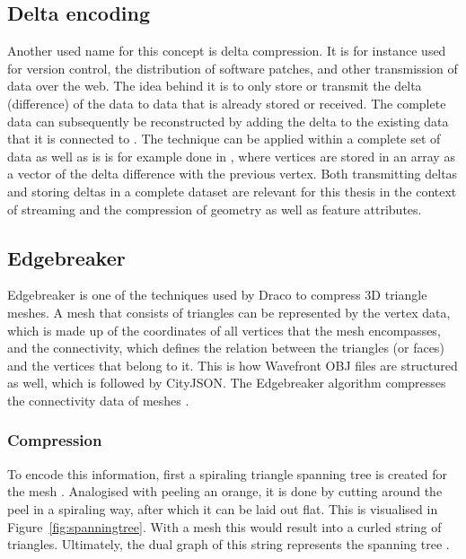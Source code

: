 \subsection{Delta encoding}
Another used name for this concept is delta compression.
It is for instance used for version control, the distribution of software patches, and other transmission of data over the web.
The idea behind it is to only store or transmit the delta (difference) of the data to data that is already stored or received.
The complete data can subsequently be reconstructed by adding the delta to the existing data that it is connected to \citep{suel2019delta}.
The technique can be applied within a complete set of data as well as is is for example done in \citet{deering1995geometry}, where vertices are stored in an array as a vector of the delta difference with the previous vertex.
Both transmitting deltas and storing deltas in a complete dataset are relevant for this thesis in the context of streaming and the compression of geometry as well as feature attributes.




\subsection{Edgebreaker}
\label{sec:theoryedgebreaker}

Edgebreaker is one of the techniques used by Draco to compress 3D triangle meshes.
A mesh that consists of triangles can be represented by the vertex data, which is made up of the coordinates of all vertices that the mesh encompasses, and the connectivity, which defines the relation between the triangles (or faces) and the vertices that belong to it.
This is how Wavefront OBJ files are structured as well, which is followed by CityJSON.
The Edgebreaker algorithm compresses the connectivity data of meshes \citep{rossignac2003edgebreaker}.\\


\subsubsection{Compression}
To encode this information, first a spiraling triangle spanning tree is created for the mesh \citep{rossignac2003edgebreaker}. Analogised with peeling an orange, it is done by cutting around the peel in a spiraling way, after which it can be laid out flat.
This is visualised in Figure~\ref{fig:spanningtree}.
With a mesh this would result into a curled string of triangles.
Ultimately, the dual graph of this string represents the spanning tree \citep{taubin1998geometry}.\\

